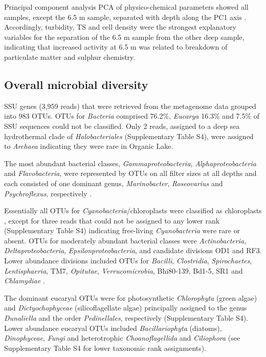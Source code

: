 Principal component analysis \acs{PCA} of physico-chemical parameters showed all samples, except the 6.5 m sample, separated with depth along the PC1 axis .
Accordingly, turbidity, \ac{TS} and cell density were the strongest explanatory variables for the separation of the 6.5 m sample from the other deep sample, indicating that increased activity at 6.5 m was related to breakdown of particulate matter and sulphur chemistry.
 

\subsection{Overall microbial diversity}
\ac{SSU} genes (3,959 reads) that were retrieved from the metagenome data grouped into 983 \acp{OTU}. 
\acp{OTU} for \emph{Bacteria} comprised 76.2\%, \emph{Eucarya} 16.3\% and 7.5\% of \ac{SSU} sequences could not be classified. 
Only 2 reads, assigned to a deep sea hydrothermal clade of \emph{Halobacteriales} (Supplementary Table S4), were assigned to \emph{Archaea} indicating they were rare in Organic Lake.
 
The most abundant bacterial classes, \emph{Gammaproteobacteria}, \emph{Alphaproteobacteria} and \emph{Flavobacteria}, were represented by \acp{OTU} on all filter sizes at all depths and each consisted of one dominant genus, \emph{Marinobacter}, \emph{Roseovarius} and \emph{Psychroflexus}, respectively . 

Essentially all \acp{OTU} for \emph{Cyanobacteria}/chloroplasts were classified as chloroplasts , except for three reads that could not be assigned to any lower rank (Supplementary Table S4) indicating free-living \emph{Cyanobacteria} were rare or absent. 
\acp{OTU} for moderately abundant bacterial classes were \emph{Actinobacteria}, \emph{Deltaproteobacteria}, \emph{Epsilonproteobacteria}, and candidate divisions OD1 and RF3. 
Lower abundance divisions included \acp{OTU} for \emph{Bacilli}, \emph{Clostridia}, \emph{Spirochaetes}, \emph{Lentisphaeria}, TM7, \emph{Opitutae}, \emph{Verrucomicrobia}, Bhi80-139, Bd1-5, SR1 and \emph{Chlamydiae} .

 The dominant eucaryal \acp{OTU} were for photosynthetic \emph{Chlorophyta} (green algae) and \emph{Dictyochophyceae} (silicoflagellate algae)  principally assigned to the genus \emph{Dunaliella} and the order \emph{Pedinellales}, respectively (Supplementary Table S4). 
Lower abundance eucaryal \acp{OTU} included \emph{Bacillariophyta} (diatoms), \emph{Dinophyceae}, \emph{Fungi} and heterotrophic \emph{Choanoflagellida} and \emph{Ciliophora} (see Supplementary Table S4 for lower taxonomic rank assignments). 



